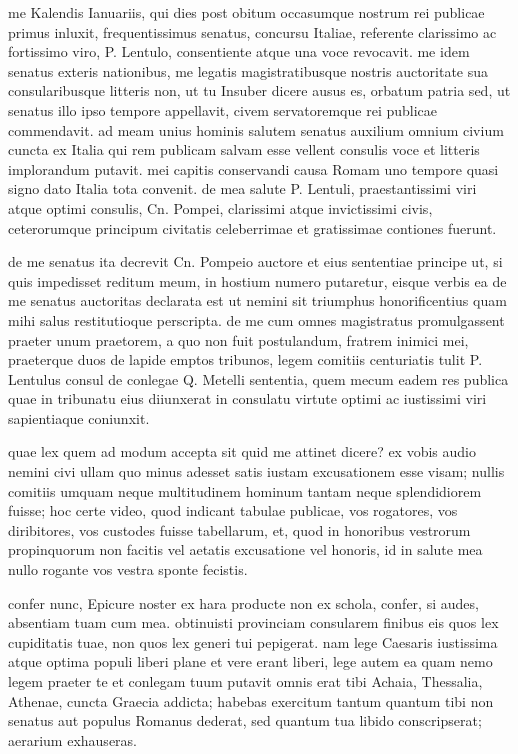  me Kalendis Ianuariis, qui dies post obitum occasumque nostrum rei publicae primus inluxit, frequentissimus senatus, concursu Italiae, referente clarissimo ac fortissimo viro, P. Lentulo, consentiente atque una voce revocavit. me idem senatus exteris nationibus, me legatis magistratibusque nostris auctoritate sua consularibusque litteris non, ut tu Insuber dicere ausus es, orbatum patria sed, ut senatus illo ipso tempore appellavit, civem servatoremque rei publicae commendavit. ad meam unius hominis salutem senatus auxilium omnium civium cuncta ex Italia qui rem publicam salvam esse vellent consulis voce et litteris implorandum putavit. mei capitis conservandi causa Romam uno tempore quasi signo dato Italia tota convenit. de mea salute P. Lentuli, praestantissimi viri atque optimi consulis, Cn. Pompei, clarissimi atque invictissimi civis, ceterorumque principum civitatis celeberrimae et gratissimae contiones fuerunt.

 de me senatus ita decrevit Cn. Pompeio auctore et eius sententiae principe ut, si quis impedisset reditum meum, in hostium numero putaretur, eisque verbis ea de me senatus auctoritas declarata est ut nemini sit triumphus honorificentius quam mihi salus restitutioque perscripta. de me cum omnes magistratus promulgassent praeter unum praetorem, a quo non fuit postulandum, fratrem inimici mei, praeterque duos de lapide emptos tribunos, legem comitiis centuriatis tulit P. Lentulus consul de conlegae Q. Metelli sententia, quem mecum eadem res publica quae in tribunatu eius diiunxerat in consulatu virtute optimi ac iustissimi viri sapientiaque coniunxit.

 quae lex quem ad modum accepta sit quid me attinet dicere? ex vobis audio nemini civi ullam quo minus adesset satis iustam excusationem esse visam; nullis comitiis umquam neque multitudinem hominum tantam neque splendidiorem fuisse; hoc certe video, quod indicant tabulae publicae, vos rogatores, vos diribitores, vos custodes fuisse tabellarum, et, quod in honoribus vestrorum propinquorum non facitis vel aetatis excusatione vel honoris, id in salute mea nullo rogante vos vestra sponte fecistis.

 confer nunc, Epicure noster ex hara producte non ex schola, confer, si audes, absentiam tuam cum mea. obtinuisti provinciam consularem finibus eis quos lex cupiditatis tuae, non quos lex generi tui pepigerat. nam lege Caesaris iustissima atque optima populi liberi plane et vere erant liberi, lege autem ea quam nemo legem praeter te et conlegam tuum putavit omnis erat tibi Achaia, Thessalia, Athenae, cuncta Graecia addicta; habebas exercitum tantum quantum tibi non senatus aut populus Romanus dederat, sed quantum tua libido conscripserat; aerarium exhauseras.

